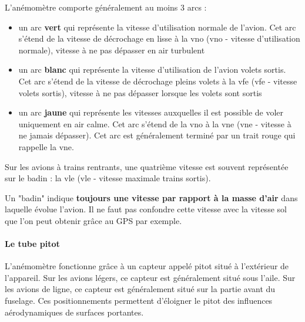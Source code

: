 	L'anémomètre comporte généralement au moins 3 arcs :
	\begin{itemize}
		\item un arc \textbf{vert} qui représente la vitesse d'utilisation normale de l'avion. Cet arc s'étend de la vitesse de décrochage en lisse à la \acrshort{vno} (\acrlong{vno} - vitesse d'utilisation normale), vitesse à ne pas dépasser en air turbulent
		\item un arc \textbf{blanc} qui représente la vitesse d'utilisation de l'avion volets sortis. Cet arc s'étend de la vitesse de décrochage pleins volets à la \acrshort{vfe} (\acrlong{vfe} - vitesse volets sortis), vitesse à ne pas dépasser lorsque les volets sont sortis
		\item un arc \textbf{jaune} qui représente les vitesses auxquelles il est possible de voler uniquement en air calme. Cet arc s'étend de la \acrshort{vno} à la \acrshort{vne} (\acrlong{vne} - vitesse à ne jamais dépasser). Cet arc est généralement terminé par un trait rouge qui rappelle la \acrshort{vne}.
	\end{itemize}
	
	Sur les avions à trains rentrants, une quatrième vitesse est souvent représentée sur le badin : la \acrshort{vle} (\acrlong{vle} - vitesse maximale trains sortis).
	
	\alert{Un "badin" indique \textbf{toujours une vitesse par rapport à la masse d'air} dans laquelle évolue l'avion. Il ne faut pas confondre cette vitesse avec la vitesse sol que l'on peut obtenir grâce au GPS par exemple.}
	
	\paragraph{Le tube pitot}
	
	L'anémomètre fonctionne grâce à un capteur appelé \gls{pitot} situé à l'extérieur de l'appareil. Sur les avions légers, ce capteur est généralement situé sous l'aile. Sur les avions de ligne, ce capteur est généralement situé sur la partie avant du fuselage. Ces positionnements permettent d'éloigner le pitot des influences aérodynamiques de surfaces portantes.
	
